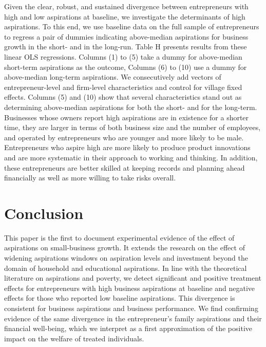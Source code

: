 \documentclass[11.5pt]{article}
\begin{document}
Given the clear, robust, and sustained divergence between entrepreneurs with high and low aspirations at baseline, we investigate the determinants of high aspirations. To this end, we use baseline data on the full sample of entrepreneurs to regress a pair of dummies indicating above-median aspirations for business growth in the short- and in the long-run. Table H presents results from these linear OLS regressions. Columns (1) to (5) take a dummy for above-median short-term aspirations as the outcome, Columns (6) to (10) use a dummy for above-median long-term aspirations. We consecutively add vectors of entrepreneur-level and firm-level characteristics and control for village fixed effects. Columns (5) and (10) show that several characteristics stand out as determining above-median aspirations for both the short- and for the long-term. Businesses whose owners report high aspirations are in existence for a shorter time, they are larger in terms of both business size and the number of employees, and operated by entrepreneurs who are younger and more likely to be male. Entrepreneurs who aspire high are more likely to produce product innovations and are more systematic in their approach to working and thinking. In addition, these entrepreneurs are better skilled at keeping records and planning ahead financially as well as more willing to take risks overall.



\section{Conclusion}\label{sec.conc}

This paper is the first to document experimental evidence of the effect of aspirations on small-business growth. It extends the research on the effect of widening aspirations windows on aspiration levels and investment beyond the domain of household and educational aspirations. In line with the theoretical literature on aspirations and poverty, we detect significant and positive treatment effects for entrepreneurs with high business aspirations at baseline and negative effects for those who reported low baseline aspirations. This divergence is consistent for business aspirations and business performance. We find confirming evidence of the same divergence in the entrepreneur's family aspirations and their financial well-being, which we interpret as a first approximation of the positive impact on the welfare of treated individuals.
\end{document}

